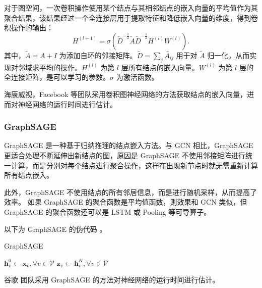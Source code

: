 对于图空间，一次卷积操作使用某个结点与其相邻结点的嵌入向量的平均值作为其聚合结果，该结果经过一个全连接层用于提取特征和降低嵌入向量的维度，得到卷积操作的输出：
\begin{equation}
    H^{(l+1)} = \sigma(\tilde{D}^{-\frac 12}\tilde{A}\tilde{D}^{-\frac 12}H^{(l)}W^{(l)}).
\end{equation}
其中，$\tilde{A} = A + I$ 为添加自环的邻接矩阵。$\tilde{D} = \sum_{j} \tilde{A_{ij}}$ 用于对 $\tilde{A}$ 归一化，从而实现对邻域求平均的操作。$H^{(l)}$ 为第 $l$ 层所有结点的嵌入向量。$W^{(l)}$ 为第 $l$ 层的全连接矩阵，是可以学习的参数。$\sigma$ 为激活函数。

海康威视\cite{haikang}，Facebook\cite{GCN2} 等团队采用卷积图神经网络的方法获取结点的嵌入向量，进而对神经网络的运行时间进行估计。

\subsubsection{GraphSAGE}

GraphSAGE \cite{GraphSAGE} 是一种基于归纳推理的结点嵌入方法。与 GCN 相比，GraphSAGE 更适合处理不断延伸出新结点的图，原因是 GraphSAGE 不使用邻接矩阵进行统一计算，而是分别对每个结点进行聚合操作，这样在出现新节点时就无需重新计算所有结点嵌入。

此外，GraphSAGE 不使用结点的所有邻居信息，而是进行随机采样，从而提高了效率。
如果 GraphSAGE 的聚合函数是平均值函数，则效果和 GCN 类似，但 GraphSAGE 的聚合函数还可以是 LSTM 或 Pooling 等可导算子。

以下为 GraphSAGE 的伪代码 \cite{GraphSAGE}。

\begin{algorithm}[H]
    \caption{GraphSAGE}
    \label{alg:GraphSAGE}
    \BlankLine
    $\mathbf{h}^0_v \leftarrow \mathbf{x}_v, \forall v \in \mathcal V$ \;
     $\mathbf{z}_v\leftarrow \mathbf{h}^{K}_v, \forall v \in \mathcal{V}$ 
\end{algorithm}
谷歌 \cite{Alearned} 团队采用 GraphSAGE 的方法对神经网络的运行时间进行估计。

